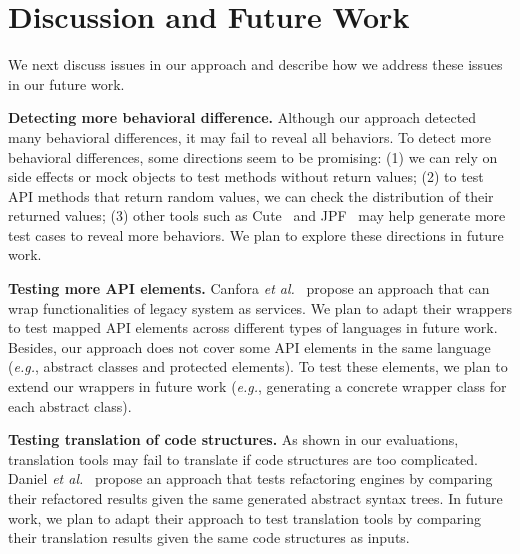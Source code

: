 

\section{Discussion and Future Work}
\label{sec:discuss}

We next discuss issues in our approach and describe how we address
these issues in our future work.

\textbf{Detecting more behavioral difference.} Although our approach detected many behavioral differences, it may fail to reveal all behaviors. To detect more behavioral differences, some directions seem to be promising: (1) we can rely on side effects or  mock objects to test methods without return values; (2) to test API methods that return random values, we can check the distribution of their returned values; (3) other tools such as Cute~\cite{koushik:cute} and JPF~\cite{visser2003mcp} may help generate more test cases to reveal more behaviors. We plan to explore these directions in future work.

\textbf{Testing more API elements.} Canfora \emph{et al.}~\cite{CanforaFFT08} propose an approach that can wrap functionalities of legacy system as services. We plan to adapt their wrappers to test mapped API elements across different types of languages in future work. Besides, our approach does not cover some API elements in the same language (\emph{e.g.}, abstract classes and protected elements). To test these elements, we plan to extend our wrappers in future work (\emph{e.g.}, generating a concrete wrapper class for each abstract class).

\textbf{Testing translation of code structures.} As shown in our evaluations, translation tools may fail to translate if code structures are too complicated. Daniel \emph{et al.}~\cite{daniel2007automated} propose an approach that tests refactoring engines by comparing their refactored results given the same generated abstract syntax trees. In future work, we plan to adapt their approach to test translation tools by comparing their translation results given the same code structures as inputs.


